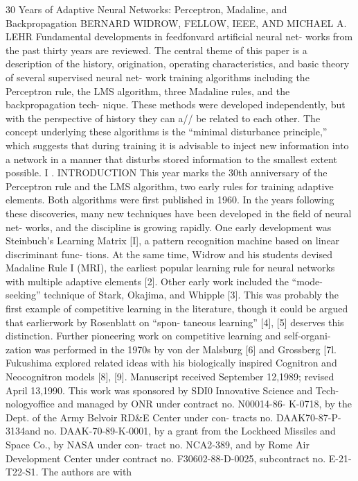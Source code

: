 30 Years of Adaptive Neural Networks: Perceptron, Madaline, and
Backpropagation BERNARD WIDROW, FELLOW, IEEE, AND MICHAEL A. LEHR
Fundamental developments in feedfonvard artificial neural net- works
from the past thirty years are reviewed. The central theme of this paper
is a description of the history, origination, operating characteristics,
and basic theory of several supervised neural net- work training
algorithms including the Perceptron rule, the LMS algorithm, three
Madaline rules, and the backpropagation tech- nique. These methods were
developed independently, but with the perspective of history they can
a// be related to each other. The concept underlying these algorithms is
the ``minimal disturbance principle,'' which suggests that during
training it is advisable to inject new information into a network in a
manner that disturbs stored information to the smallest extent possible.
I . INTRODUCTION This year marks the 30th anniversary of the Perceptron
rule and the LMS algorithm, two early rules for training adaptive
elements. Both algorithms were first published in 1960. In the years
following these discoveries, many new techniques have been developed in
the field of neural net- works, and the discipline is growing rapidly.
One early development was Steinbuch's Learning Matrix {[}I{]}, a pattern
recognition machine based on linear discriminant func- tions. At the
same time, Widrow and his students devised Madaline Rule I (MRI), the
earliest popular learning rule for neural networks with multiple
adaptive elements {[}2{]}. Other early work included the
``mode-seeking'' technique of Stark, Okajima, and Whipple {[}3{]}. This
was probably the first example of competitive learning in the
literature, though it could be argued that earlierwork by Rosenblatt on
``spon- taneous learning'' {[}4{]}, {[}5{]} deserves this distinction.
Further pioneering work on competitive learning and self-organi- zation
was performed in the 1970s by von der Malsburg {[}6{]} and Grossberg
{[}7l. Fukushima explored related ideas with his biologically inspired
Cognitron and Neocognitron models {[}8{]}, {[}9{]}. Manuscript received
September 12,1989; revised April 13,1990. This work was sponsored by
SDI0 Innovative Science and Tech- nologyoffice and managed by ONR under
contract no. N00014-86- K-0718, by the Dept. of the Army Belvoir RD\&E
Center under con- tracts no. DAAK70-87-P-3134and no. DAAK-70-89-K-0001,
by a grant from the Lockheed Missiles and Space Co., by NASA under con-
tract no. NCA2-389, and by Rome Air Development Center under contract
no. F30602-88-D-0025, subcontract no. E-21-T22-S1. The authors are with
